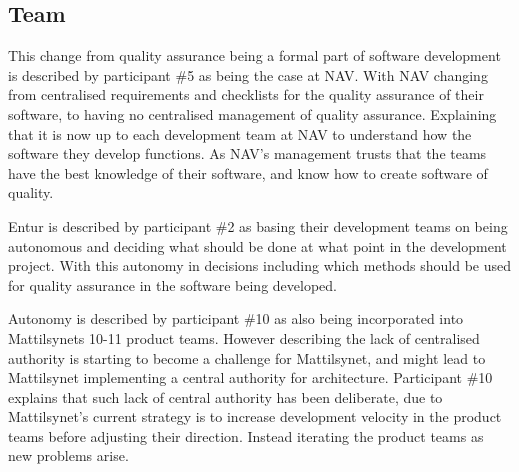 \subsection{Team} \label{sec:team}
This change from quality assurance being a formal part of software development is described by participant \#5 as being the case at NAV. With NAV changing from centralised requirements and checklists for the quality assurance of their software, to having no centralised management of quality assurance. Explaining that it is now up to each development team at NAV to understand how the software they develop functions. As NAV's management trusts that the teams have the best knowledge of their software, and know how to create software of quality.


Entur is described by participant \#2 as basing their development teams on being autonomous and deciding what should be done at what point in the development project. With this autonomy in decisions including which methods should be used for quality assurance in the software being developed.


Autonomy is described by participant \#10 as also being incorporated into Mattilsynets 10-11 product teams. However describing the lack of centralised authority is starting to become a challenge for Mattilsynet, and might lead to Mattilsynet implementing a central authority for architecture. Participant \#10 explains that such lack of central authority has been deliberate, due to Mattilsynet's current strategy is to increase development velocity in the product teams before adjusting their direction. Instead iterating the product teams as new problems arise.


